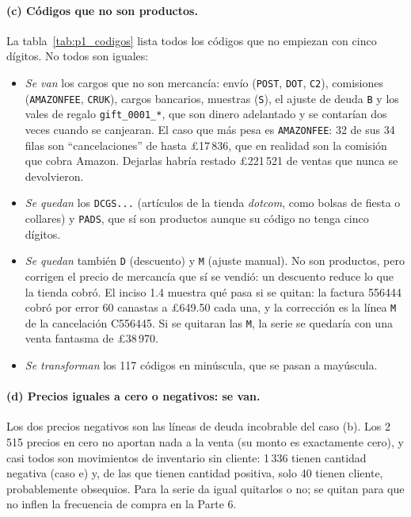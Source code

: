 \paragraph{(c) Códigos que no son productos.} La tabla~\ref{tab:p1_codigos}
lista todos los códigos que no empiezan con cinco dígitos. No todos son
iguales:
\begin{itemize}
  \item \emph{Se van} los cargos que no son mercancía: envío (\texttt{POST},
    \texttt{DOT}, \texttt{C2}), comisiones (\texttt{AMAZONFEE},
    \texttt{CRUK}), cargos bancarios, muestras (\texttt{S}), el ajuste de
    deuda \texttt{B} y los vales de regalo \texttt{gift\_0001\_*}, que son
    dinero adelantado y se contarían dos veces cuando se canjearan. El caso
    que más pesa es \texttt{AMAZONFEE}: 32 de sus 34 filas son
    ``cancelaciones'' de hasta \pounds17\,836, que en realidad son la
    comisión que cobra Amazon. Dejarlas habría restado \pounds221\,521 de
    ventas que nunca se devolvieron.
  \item \emph{Se quedan} los \texttt{DCGS...} (artículos de la tienda
    \emph{dotcom}, como bolsas de fiesta o collares) y \texttt{PADS}, que sí
    son productos aunque su código no tenga cinco dígitos.
  \item \emph{Se quedan} también \texttt{D} (descuento) y \texttt{M}
    (ajuste manual). No son productos, pero corrigen el precio de mercancía
    que sí se vendió: un descuento reduce lo que la tienda cobró. El inciso
    1.4 muestra qué pasa si se quitan: la factura 556444 cobró por error 60
    canastas a \pounds649.50 cada una, y la corrección es la línea
    \texttt{M} de la cancelación C556445. Si se quitaran las \texttt{M}, la
    serie se quedaría con una venta fantasma de \pounds38\,970.
  \item \emph{Se transforman} los 117 códigos en minúscula, que se pasan a
    mayúscula.
\end{itemize}

\begin{table}[H]
  \centering
  \small
  \caption{Códigos que no empiezan con cinco dígitos, en los datos crudos. La
  columna de cancelación es el porcentaje de sus filas en facturas \texttt{C}.}
  \label{tab:p1_codigos}
\end{table}

\paragraph{(d) Precios iguales a cero o negativos: se van.} Los dos precios
negativos son las líneas de deuda incobrable del caso (b). Los 2\,515 precios
en cero no aportan nada a la venta (su monto es exactamente cero), y casi
todos son movimientos de inventario sin cliente: 1\,336 tienen cantidad
negativa (caso e) y, de las que tienen cantidad positiva, solo 40 tienen
cliente, probablemente obsequios. Para la serie da igual quitarlos o no; se
quitan para que no inflen la frecuencia de compra en la Parte 6.

